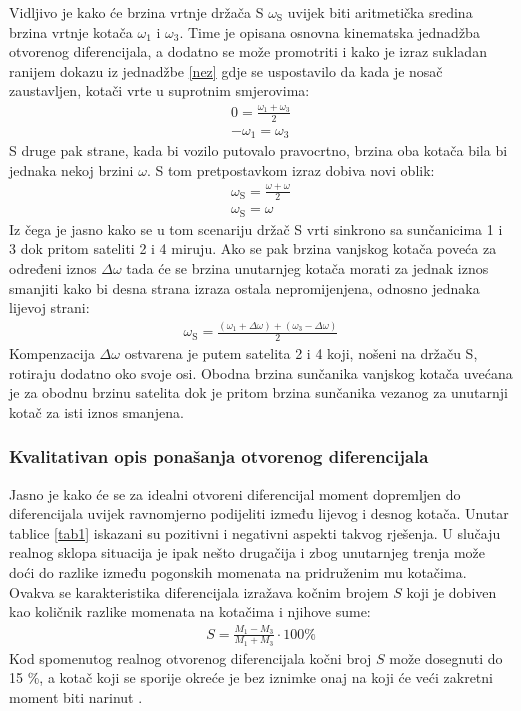\documentclass[11pt]{article}
\numberwithin{equation}{section}%
\begin{document}
Vidljivo je kako će brzina vrtnje držača S $\omega_\text{S}$ uvijek biti aritmetička sredina brzina vrtnje kotača $\omega_1$ i $\omega_3$. Time je opisana osnovna kinematska jednadžba otvorenog diferencijala, a dodatno se može promotriti i kako je izraz sukladan ranijem dokazu iz jednadžbe \ref{nez} gdje se uspostavilo da kada je nosač zaustavljen, kotači vrte u suprotnim smjerovima:
%
\begin{gather}
0=\frac{\omega_1+
 \omega_3}{2}\\
 -\omega_1=\omega_3
\end{gather}
%
S druge pak strane, kada bi vozilo putovalo pravocrtno, brzina oba kotača bila bi jednaka nekoj brzini $\omega$. S tom pretpostavkom izraz %
dobiva novi oblik:
\begin{gather}
\omega_\text{S}=\frac{\omega+
 \omega}{2}\\
 \omega_\text{S}=\omega
\end{gather}
Iz čega je jasno kako se u tom scenariju držač S vrti sinkrono sa sunčanicima 1 i 3 dok pritom sateliti 2 i 4 miruju. Ako se pak brzina vanjskog kotača poveća za određeni iznos $\Delta \omega$ tada će se brzina unutarnjeg kotača morati za jednak iznos smanjiti kako bi desna strana izraza ostala nepromijenjena, odnosno jednaka lijevoj strani:
\begin{gather}
\omega_\text{S}=\frac{(\omega_1+\Delta \omega)+(\omega_3-\Delta \omega)}{2}
\end{gather}
Kompenzacija $\Delta \omega$ ostvarena je putem satelita 2 i 4 koji, nošeni na držaču S, rotiraju dodatno oko svoje osi. Obodna brzina sunčanika vanjskog kotača uvećana je za obodnu brzinu satelita dok je pritom brzina sunčanika vezanog za unutarnji kotač za isti iznos smanjena.

\subsubsection{Kvalitativan opis ponašanja otvorenog diferencijala}

Jasno je kako će se za idealni otvoreni diferencijal moment dopremljen do diferencijala uvijek ravnomjerno podijeliti između lijevog i desnog kotača. Unutar tablice \ref{tab1} iskazani su pozitivni i negativni aspekti takvog rješenja. U slučaju realnog sklopa situacija je ipak nešto drugačija i zbog unutarnjeg trenja može doći do razlike između pogonskih momenata na pridruženim mu kotačima. Ovakva se karakteristika diferencijala izražava kočnim brojem $S$ koji je dobiven kao količnik razlike momenata na kotačima i njihove sume:
\begin{gather}
S=\frac{M_1-M_3}{M_1+M_3}\cdot 100\%
\end{gather}
Kod spomenutog realnog otvorenog diferencijala kočni broj $S$ može dosegnuti do 15 \%, a kotač koji se sporije okreće je bez iznimke onaj na koji će veći zakretni moment biti narinut \cite{milliken1995race}.
\end{document}
